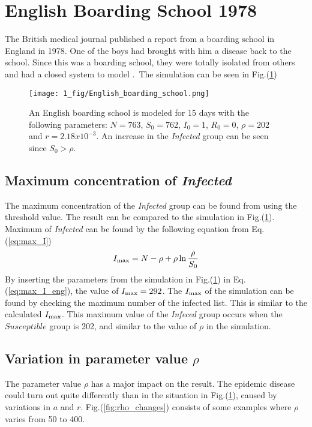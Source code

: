 \documentclass[%
twoside,                 %
final,                   %
chapterprefix=true,      %
open=right               %
10pt]{book}
\begin{document}
\section{English Boarding School 1978}
The British medical journal published a report from a boarding school in England in 1978. One of the boys had brought with him a disease back to the school. Since this was a boarding school, they were totally isolated from others and had a closed system to model \cite[p.~325]{murray2002mathematical}.~The simulation can be seen in Fig.(\ref{fig:english_boarding})  


\begin{figure}[ht]
  \centerline{\texttt{[image: 1\_fig/English\_boarding\_school.png]}}
  \caption{
  \label{fig:english_boarding} An English boarding school is modeled for 15 days with the following parameters: $N=763$, $S_0=762$, $I_0=1$, $R_0=0$, $\rho=202$ and $r=2.18 x 10^{-3}$. An increase in the \emph{Infected} group can be seen since $S_0 > \rho$.
  }
\end{figure}


\subsection{Maximum concentration of \emph{Infected}}
The maximum concentration of the \emph{Infected} group can be found from using the threshold value. The result can be compared to the simulation in Fig.(\ref{fig:english_boarding}). Maximum of \emph{Infected} can be found by the following equation from Eq.(\ref{eq:max_I})
\begin{equation} \label{eq:max_I_eng}
I_{\textrm{max}}= N - \rho + \rho \ln\frac{\rho}{S_0} 
\end{equation}
By inserting the parameters from the simulation in Fig.(\ref{fig:english_boarding}) in Eq.(\ref{eq:max_I_eng}), the value of $I_{\textrm{max}} = 292$. The $I_{\textrm{max}}$ of the simulation can be found by checking the maximum number of the infected list. This is similar to the calculated $I_{\textrm{max}}$. This maximum value of the \emph{Infeced} group occurs when the $Susceptible$ group is 202, and similar to the value of $\rho$ in the simulation.

\subsection{Variation in parameter value $\rho$}
The parameter value $\rho$ has a major impact on the result. The epidemic disease could turn out quite differently than in the situation in Fig.(\ref{fig:english_boarding}), caused by variations in $a$ and $r$. Fig.(\ref{fig:rho_changes}) consists of some examples where $\rho$ varies from 50 to 400.
\end{document}
